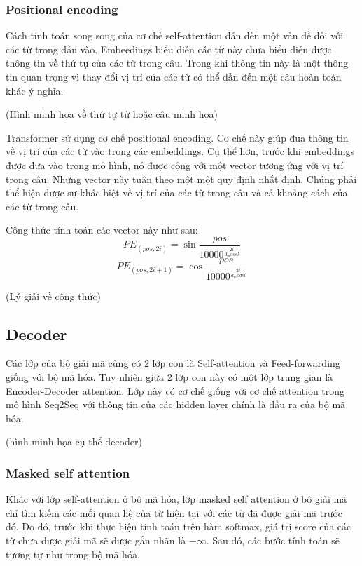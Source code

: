 \subsubsection{Positional encoding}

Cách tính toán song song của cơ chế self-attention dẫn đến một vấn đề đối với các từ trong đầu vào. Embeedings biểu diễn các từ này chưa biểu diễn được thông tin về thứ tự của các từ trong câu. Trong khi thông tin này là một thông tin quan trọng vì thay đổi vị trí của các từ có thể dẫn đến một câu hoàn toàn khác ý nghĩa.

(Hình minh họa về thứ tự từ hoặc câu minh họa)

Transformer sử dụng cơ chế positional encoding. Cơ chế này giúp đưa thông tin về vị trí của các từ vào trong các embeddings. Cụ thể hơn, trước khi embeddings được đưa vào trong mô hình, nó được cộng với một vector tương ứng với vị trí trong câu. Những vector này tuân theo một một quy định nhất định. Chúng phải thể hiện được sự khác biệt về vị trí của các từ trong câu và cả khoảng cách của các từ trong câu. 

Công thức tính toán các vector này như sau: 
\begin{equation*}
	PE_{(pos, 2i)} = \sin{\frac{pos}{10000^{\frac{2i}{d_model}}}}
\end{equation*}
\begin{equation*}
	PE_{(pos, 2i+1)} = \cos{\frac{pos}{10000^{\frac{2i}{d_model}}}}
\end{equation*}

(Lý giải về công thức)


\subsection{Decoder}
Các lớp của bộ giải mã cũng có 2 lớp con là Self-attention và Feed-forwarding giống với bộ mã hóa. Tuy nhiên giữa 2 lớp con này có một lớp trung gian là Encoder-Decoder attention. Lớp này có cơ chế giống với cơ chế attention trong mô hình Seq2Seq với thông tin của các hidden layer chính là đầu ra của bộ mã hóa.

(hình minh họa cụ thể decoder)

\subsubsection{Masked self attention}

Khác với lớp self-attention ở bộ mã hóa, lớp masked self attention ở bộ giải mã chỉ tìm kiếm các mối quan hệ của từ hiện tại với các từ đã được giải mã trước đó. Do đó, trước khi thực hiện tính toán trên hàm softmax, giá trị score của các từ chưa được giải mã sẽ được gắn nhãn là $-\infty$. Sau đó, các bước tính toán sẽ tương tự như trong bộ mã hóa.

